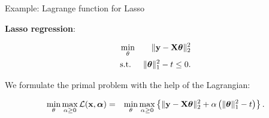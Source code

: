 \begin{vbframe}{Example: Lagrange function for Lasso}

\textbf{Lasso regression}: 

\begin{eqnarray*}
	\min_\theta && \|\mathbf{y} - \mathbf{X} \bm{\theta}\|_2^2 \\
	\text{s.t. } && \|\bm{\theta}\|^2_1 - t \le 0.
\end{eqnarray*}

We formulate the primal problem with the help of the Lagrangian:

\begin{eqnarray*}
	\min_\theta \max_{\alpha \ge 0} \mathcal{L}(\mathbf{x}, \bm{\alpha}) &=& \min_\theta \max_{\alpha \ge 0} \left\{\|\mathbf{y} - \mathbf{X} \bm{\theta}\|_2^2 + \alpha \left(\|\bm{\theta}\|^2_1 - t\right)\right\}.
\end{eqnarray*}


\end{vbframe}


